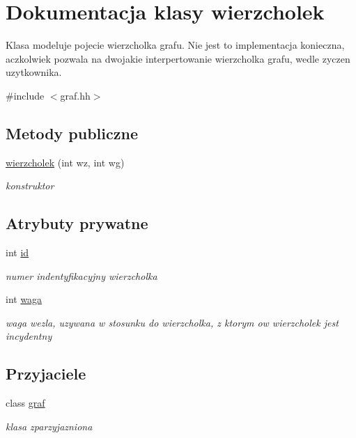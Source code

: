 
\hypertarget{classwierzcholek}{\section{\-Dokumentacja klasy wierzcholek}
\label{classwierzcholek}
}


\-Klasa modeluje pojecie wierzcholka grafu. \-Nie jest to implementacja konieczna, aczkolwiek pozwala na dwojakie interpertowanie wierzcholka grafu, wedle zyczen uzytkownika.  




{\ttfamily \#include $<$graf.\-hh$>$}

\subsection*{\-Metody publiczne}
\begin{DoxyCompactItemize}
\item 
\hyperlink{classwierzcholek_a04bee94b3f5b84064bf8dc16bf8b87f1}{wierzcholek} (int wz, int wg)
\begin{DoxyCompactList}\small\item\em konstruktor \end{DoxyCompactList}\end{DoxyCompactItemize}
\subsection*{\-Atrybuty prywatne}
\begin{DoxyCompactItemize}
\item 
int \hyperlink{classwierzcholek_ada68383887e4523b766e2c1e5ab6fa6e}{id}
\begin{DoxyCompactList}\small\item\em numer indentyfikacyjny wierzcholka \end{DoxyCompactList}\item 
int \hyperlink{classwierzcholek_a3c53d7c09f6e83be8808bd78d6221e08}{waga}
\begin{DoxyCompactList}\small\item\em waga wezla, uzywana w stosunku do wierzcholka, z ktorym ow wierzcholek jest incydentny \end{DoxyCompactList}\end{DoxyCompactItemize}
\subsection*{\-Przyjaciele}
\begin{DoxyCompactItemize}
\item 
class \hyperlink{classwierzcholek_a1726ca1919686bdccbca505bacf6de2f}{graf}
\begin{DoxyCompactList}\small\item\em klasa zparzyjazniona \end{DoxyCompactList}\end{DoxyCompactItemize}


